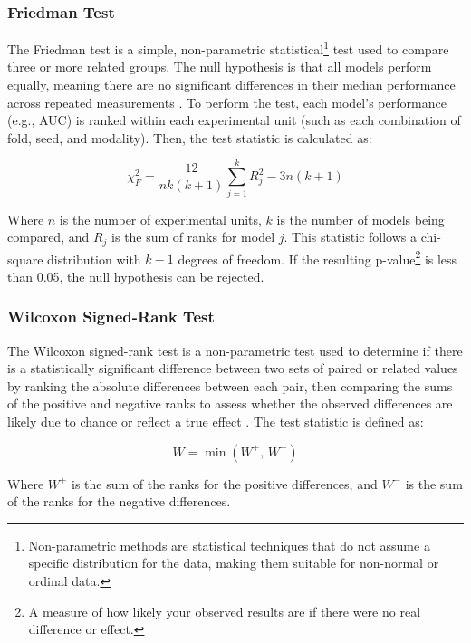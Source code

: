 \documentclass[a4paper,10pt]{book}
\begin{document}
\subsubsection{Friedman Test}

The Friedman test is a simple, non-parametric statistical\footnote{Non-parametric methods are statistical techniques that do not assume a specific distribution for the data, making them suitable for non-normal or ordinal data.} test used to compare three or more related groups. The null hypothesis is that all models perform equally, meaning there are no significant differences in their median performance across repeated measurements \cite{demsar_statistical_2006}. To perform the test, each model’s performance (e.g., AUC) is ranked within each experimental unit (such as each combination of fold, seed, and modality). Then, the test statistic is calculated as:

\begin{equation}
\chi^2_F = \frac{12}{nk(k+1)} \sum_{j=1}^{k} R_j^2 - 3n(k+1)
\end{equation}

\noindent
Where $n$ is the number of experimental units, $k$ is the number of models being compared, and $R_j$ is the sum of ranks for model $j$. This statistic follows a chi-square distribution with $k-1$ degrees of freedom. If the resulting p-value\footnote{A measure of how likely your observed results are if there were no real difference or effect.} is less than 0.05, the null hypothesis can be rejected.

\subsubsection{Wilcoxon Signed-Rank Test}

The Wilcoxon signed-rank test is a non-parametric test used to determine if there is a statistically significant difference between two sets of paired or related values by ranking the absolute differences between each pair, then comparing the sums of the positive and negative ranks to assess whether the observed differences are likely due to chance or reflect a true effect \cite{demsar_statistical_2006}. The test statistic is defined as:

\begin{equation}
W = \min \left( W^+,\, W^- \right)
\end{equation}


Where $W^+$ is the sum of the ranks for the positive differences, and $W^-$ is the sum of the ranks for the negative differences.
\end{document}

